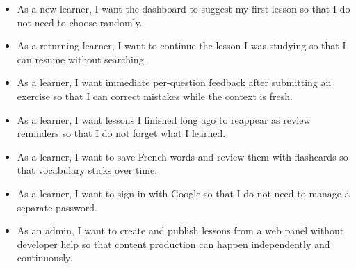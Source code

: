 \begin{itemize}[leftmargin=*]
  \item As a new learner, I want the dashboard to suggest my first lesson so that I do not need to choose randomly.
  \item As a returning learner, I want to continue the lesson I was studying so that I can resume without searching.
  \item As a learner, I want immediate per-question feedback after submitting an exercise so that I can correct mistakes while the context is fresh.
  \item As a learner, I want lessons I finished long ago to reappear as review reminders so that I do not forget what I learned.
  \item As a learner, I want to save French words and review them with flashcards so that vocabulary sticks over time.
  \item As a learner, I want to sign in with Google so that I do not need to manage a separate password.
  \item As an admin, I want to create and publish lessons from a web panel without developer help so that content production can happen independently and continuously.
\end{itemize}
